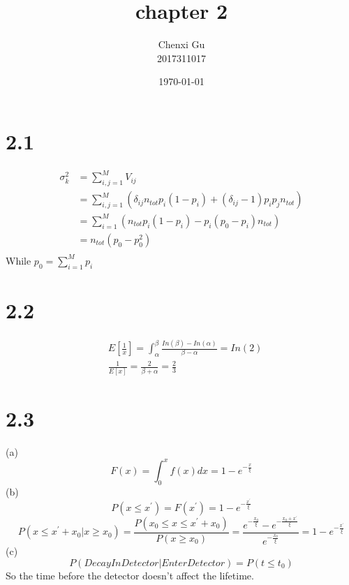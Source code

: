 \documentclass{article}
\begin{document}
\begin{CJK*}{GBK}{song}

\pagestyle{fancy}  
\fancyhead{} %
\renewcommand{\headrulewidth}{0.4pt}  
\renewcommand{\footrulewidth}{0.4pt} 



\title {chapter 2}
\author{Chenxi Gu\\2017311017}

\date{\today}

\maketitle
\section{2.1}
\begin{equation}
\begin{aligned}
\sigma^2_k&=\sum_{i,j=1}^MV_{ij}\\
&=\sum_{i,j=1}^M(\delta_{ij}n_{tot}p_i(1-p_i)+(\delta_{ij}-1)p_ip_jn_{tot})\\
&=\sum_{i=1}^M(n_{tot}p_i(1-p_i)-p_i(p_0-p_i)n_{tot})\\
&=n_{tot}(p_0-p_0^2)\\
\end{aligned}
\end{equation}
While $p_0=\sum_{i=1}^Mp_i$


\section{2.2}
\begin{equation}
\begin{aligned}
&E[\frac{1}{x}]=\int^{\beta}_{\alpha}\frac{In(\beta)-In(\alpha)}{\beta-\alpha}=In(2)\\
&\frac{1}{E[x]}=\frac{2}{\beta+\alpha}=\frac{2}{3}
\end{aligned}
\end{equation}

\section{2.3}
(a)
\begin{equation}
F(x)=\int^x_0f(x)dx=1-e^{-\frac{x}{\xi}}
\end{equation}
(b)
\begin{equation}
P(x\le x^{'})=F(x^{'})=1-e^{-\frac{x^{'}}{\xi}}
\end{equation}
\begin{equation}
P(x\le x^{'}+x_0|x\ge x_0)=\frac{P(x_0\le x\le x^{'}+x_0)}{P(x\ge x_0)}=\frac{e^{-\frac{x_0}{\xi}}-e^{-\frac{x_0+x^{'}}{\xi}}}{e^{-\frac{x_0}{\xi}}}=1-e^{-\frac{x^{'}}{\xi}}
\end{equation}
(c)
\begin{equation}
P(Decay In Detector|Enter Detector)=P(t\le t_0)
\end{equation}
So the time before the detector doesn't affect the lifetime.


\end{CJK*}
\end{document}

